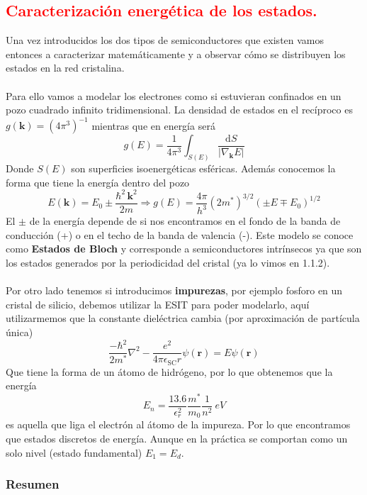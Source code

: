 \subsection{\textcolor{red}{Caracterización energética de los estados.}} \label{sec: Caracterizacion g de los estados}
Una vez introducidos los dos tipos de semiconductores que existen vamos entonces a caracterizar matemáticamente y a observar cómo se distribuyen los estados en la red cristalina.\\\\
Para ello vamos a modelar los electrones como si estuvieran confinados en un pozo cuadrado infinito tridimensional.
La densidad de estados en el recíproco es $g(\mathbf{k})=(4\pi^3)^{-1}$ mientras que en energía será $$g(E)=\frac{1}{4\pi^3} \int_{S(E)} \frac{\mathrm{d}S}{|\nabla_\mathbf{k} E|}$$ Donde $S(E)$ son superficies isoenergéticas esféricas. Además conocemos la forma que tiene la energía dentro del pozo
\begin{equation}
    E(\mathbf{k})=E_0\pm \frac{\hbar^2\, \mathbf{k}^2}{2m} \Rightarrow g(E)=\frac{4\pi}
{h^3} (2m^*)^{3/2}(\pm E \mp E_0)^{1/2}
\label{eq: Densidad de estados energetica}
\end{equation}
El $\pm$ de la energía depende de si nos encontramos en el fondo de la banda de conducción (+) o en el techo de la banda de valencia (-). Este modelo se conoce como \textbf{Estados de Bloch} y corresponde a semiconductores intrínsecos ya que son los estados generados por la periodicidad del cristal (ya lo vimos en 1.1.2).\\\\
Por otro lado tenemos si introducimos \textbf{impurezas}, por ejemplo fosforo en un cristal de silicio, debemos utilizar la ESIT para poder modelarlo, aquí utilizarmemos que la constante dieléctrica cambia (por aproximación de partícula única)
\begin{equation}
    \frac{-\hbar^2}{2m^*}\nabla^2-\frac{e^2}{4\pi \epsilon_\mathrm{SC}r}\psi(\textbf{r})=E\psi(\textbf{r})
\end{equation}
Que tiene la forma de un átomo de hidrógeno, por lo que obtenemos que la energía $$E_n=\frac{13.6}{\epsilon_r^2} \frac{m^*}{m_0} \frac{1}{n^2} \ \unit{eV}$$ es aquella que liga el electrón al átomo de la impureza. Por lo que encontramos que estados discretos de energía. Aunque en la práctica se comportan como un solo nivel (estado fundamental) $E_1=E_d$.
\subsubsection{Resumen}

